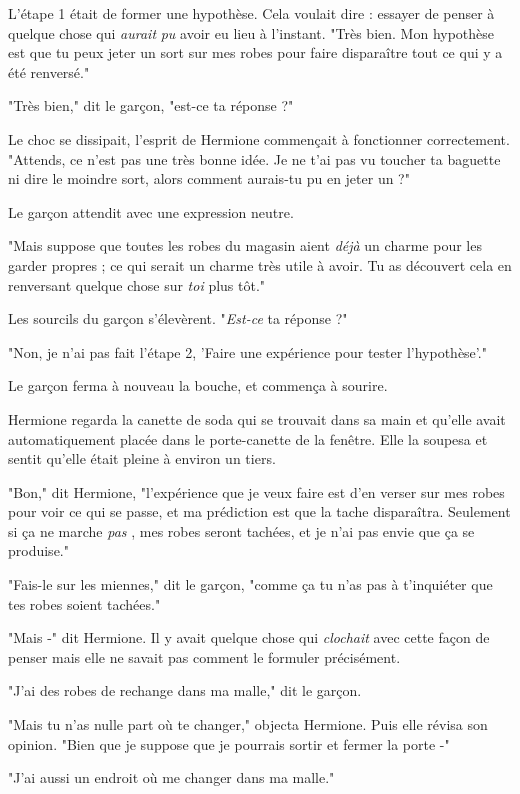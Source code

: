 L'étape 1 était de former une hypothèse. Cela voulait dire : essayer de penser à quelque chose qui \emph{aurait}  \emph{pu}  avoir eu lieu à l'instant. "Très bien. Mon hypothèse est que tu peux jeter un sort sur mes robes pour faire disparaître tout ce qui y a été renversé."

"Très bien," dit le garçon, "est-ce ta réponse ?"

Le choc se dissipait, l'esprit de Hermione commençait à fonctionner correctement. "Attends, ce n'est pas une très bonne idée. Je ne t'ai pas vu toucher ta baguette ni dire le moindre sort, alors comment aurais-tu pu en jeter un ?"

Le garçon attendit avec une expression neutre.

"Mais suppose que toutes les robes du magasin aient \emph{déjà}  un charme pour les garder propres ; ce qui serait un charme très utile à avoir. Tu as découvert cela en renversant quelque chose sur \emph{toi}  plus tôt."

Les sourcils du garçon s'élevèrent. "\emph{Est-ce}  ta réponse ?"

"Non, je n'ai pas fait l'étape 2, 'Faire une expérience pour tester l'hypothèse'."

Le garçon ferma à nouveau la bouche, et commença à sourire.

Hermione regarda la canette de soda qui se trouvait dans sa main et qu'elle avait automatiquement placée dans le porte-canette de la fenêtre. Elle la soupesa et sentit qu'elle était pleine à environ un tiers.

"Bon," dit Hermione, "l'expérience que je veux faire est d'en verser sur mes robes pour voir ce qui se passe, et ma prédiction est que la tache disparaîtra. Seulement si ça ne marche \emph{pas} , mes robes seront tachées, et je n'ai pas envie que ça se produise."

"Fais-le sur les miennes," dit le garçon, "comme ça tu n'as pas à t'inquiéter que tes robes soient tachées."

"Mais -" dit Hermione. Il y avait quelque chose qui \emph{clochait}  avec cette façon de penser mais elle ne savait pas comment le formuler précisément.

"J'ai des robes de rechange dans ma malle," dit le garçon.

"Mais tu n'as nulle part où te changer," objecta Hermione. Puis elle révisa son opinion. "Bien que je suppose que je pourrais sortir et fermer la porte -"

"J'ai aussi un endroit où me changer dans ma malle."

